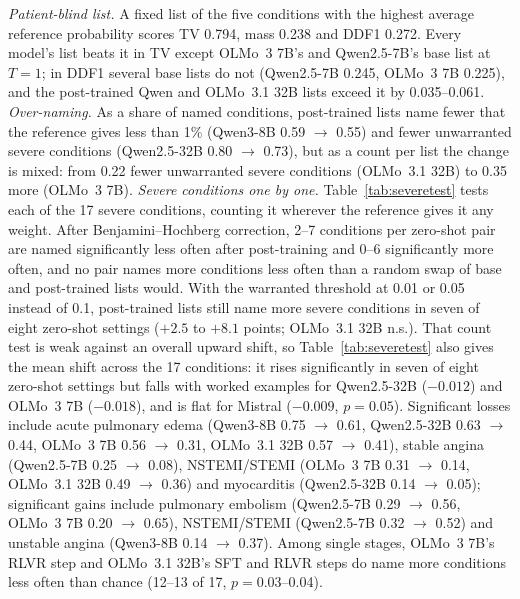\documentclass[wcp]{jmlr}
\begin{document}
\emph{Patient-blind list.} A fixed list of the five conditions with the highest average reference probability scores TV 0.794, mass 0.238 and DDF1 0.272. Every model's list beats it in TV except OLMo~3 7B's and Qwen2.5-7B's base list at $T{=}1$; in DDF1 several base lists do not (Qwen2.5-7B 0.245, OLMo~3 7B 0.225), and the post-trained Qwen and OLMo~3.1 32B lists exceed it by 0.035--0.061.
\emph{Over-naming.} As a share of named conditions, post-trained lists name fewer that the reference gives less than 1\% (Qwen3-8B 0.59 $\rightarrow$ 0.55) and fewer unwarranted severe conditions (Qwen2.5-32B 0.80 $\rightarrow$ 0.73), but as a count per list the change is mixed: from 0.22 fewer unwarranted severe conditions (OLMo~3.1 32B) to 0.35 more (OLMo~3 7B).
\emph{Severe conditions one by one.} Table~\ref{tab:severetest} tests each of the 17 severe conditions, counting it wherever the reference gives it any weight. After Benjamini--Hochberg correction, 2--7 conditions per zero-shot pair are named significantly less often after post-training and 0--6 significantly more often, and no pair names more conditions less often than a random swap of base and post-trained lists would. With the warranted threshold at 0.01 or 0.05 instead of 0.1, post-trained lists still name more severe conditions in seven of eight zero-shot settings ($+2.5$ to $+8.1$ points; OLMo~3.1 32B n.s.). That count test is weak against an overall upward shift, so Table~\ref{tab:severetest} also gives the mean shift across the 17 conditions: it rises significantly in seven of eight zero-shot settings but falls with worked examples for Qwen2.5-32B ($-0.012$) and OLMo~3 7B ($-0.018$), and is flat for Mistral ($-0.009$, $p{=}0.05$). Significant losses include acute pulmonary edema (Qwen3-8B 0.75 $\rightarrow$ 0.61, Qwen2.5-32B 0.63 $\rightarrow$ 0.44, OLMo~3 7B 0.56 $\rightarrow$ 0.31, OLMo~3.1 32B 0.57 $\rightarrow$ 0.41), stable angina (Qwen2.5-7B 0.25 $\rightarrow$ 0.08), NSTEMI/STEMI (OLMo~3 7B 0.31 $\rightarrow$ 0.14, OLMo~3.1 32B 0.49 $\rightarrow$ 0.36) and myocarditis (Qwen2.5-32B 0.14 $\rightarrow$ 0.05); significant gains include pulmonary embolism (Qwen2.5-7B 0.29 $\rightarrow$ 0.56, OLMo~3 7B 0.20 $\rightarrow$ 0.65), NSTEMI/STEMI (Qwen2.5-7B 0.32 $\rightarrow$ 0.52) and unstable angina (Qwen3-8B 0.14 $\rightarrow$ 0.37). Among single stages, OLMo~3 7B's RLVR step and OLMo~3.1 32B's SFT and RLVR steps do name more conditions less often than chance (12--13 of 17, $p{=}0.03$--0.04).
\end{document}
